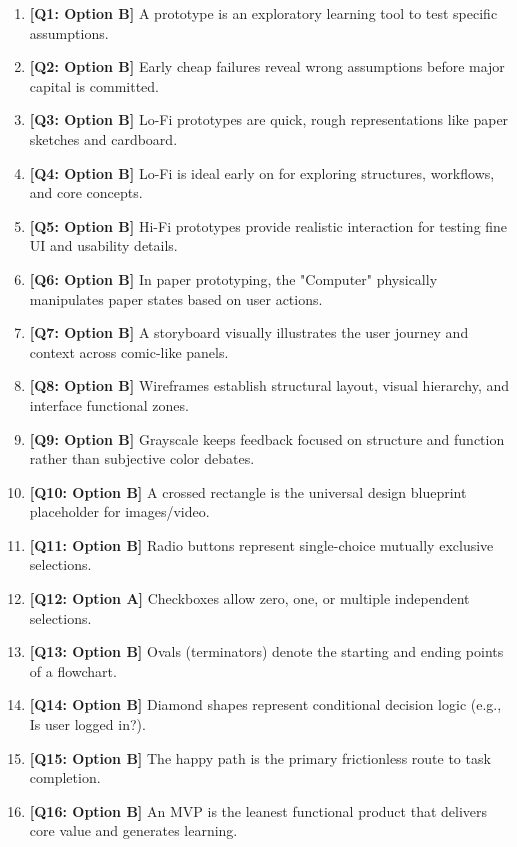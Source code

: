 \begin{expbox}
\begin{enumerate}[leftmargin=6mm, itemsep=2.5mm]
  \item \textbf{[Q1: Option B]} A prototype is an exploratory learning tool to test specific assumptions.
  \item \textbf{[Q2: Option B]} Early cheap failures reveal wrong assumptions before major capital is committed.
  \item \textbf{[Q3: Option B]} Lo-Fi prototypes are quick, rough representations like paper sketches and cardboard.
  \item \textbf{[Q4: Option B]} Lo-Fi is ideal early on for exploring structures, workflows, and core concepts.
  \item \textbf{[Q5: Option B]} Hi-Fi prototypes provide realistic interaction for testing fine UI and usability details.
  \item \textbf{[Q6: Option B]} In paper prototyping, the "Computer" physically manipulates paper states based on user actions.
  \item \textbf{[Q7: Option B]} A storyboard visually illustrates the user journey and context across comic-like panels.
  \item \textbf{[Q8: Option B]} Wireframes establish structural layout, visual hierarchy, and interface functional zones.
  \item \textbf{[Q9: Option B]} Grayscale keeps feedback focused on structure and function rather than subjective color debates.
  \item \textbf{[Q10: Option B]} A crossed rectangle is the universal design blueprint placeholder for images/video.
  \item \textbf{[Q11: Option B]} Radio buttons represent single-choice mutually exclusive selections.
  \item \textbf{[Q12: Option A]} Checkboxes allow zero, one, or multiple independent selections.
  \item \textbf{[Q13: Option B]} Ovals (terminators) denote the starting and ending points of a flowchart.
  \item \textbf{[Q14: Option B]} Diamond shapes represent conditional decision logic (e.g., Is user logged in?).
  \item \textbf{[Q15: Option B]} The happy path is the primary frictionless route to task completion.
  \item \textbf{[Q16: Option B]} An MVP is the leanest functional product that delivers core value and generates learning.

\end{enumerate}
\end{expbox}
